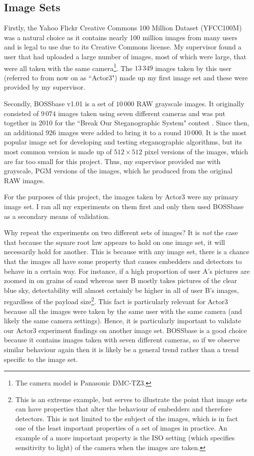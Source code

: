 \documentclass[11pt,a4paper,twoside,openright]{report}
\begin{document}
\subsection{Image Sets}

Firstly, the Yahoo Flickr Creative Commons 100 Million Dataset (YFCC100M) \cite{yfcc100m} was a natural choice as it contains nearly 100 million images from many users and is legal to use due to its Creative Commons license. My supervisor found a user that had uploaded a large number of images, most of which were large, that were all taken with the same camera\footnote{The camera model is Panasonic DMC-TZ3.}. The $13\,349$ images taken by this user (referred to from now on as ``Actor3") made up my first image set and these were provided by my supervisor.

Secondly, BOSSbase v1.01 \cite{binghamton-downloads} is a set of $10\,000$ RAW grayscale images. It originally consisted of $9\,074$ images taken using seven different cameras and was put together in 2010 for the ``Break Our Steganographic System" contest \cite{bossbase}. Since then, an additional 926 images were added to bring it to a round $10\,000$. It is the most popular image set for developing and testing steganographic algorithms, but its most common version is made up of $512\times512$ pixel versions of the images, which are far too small for this project. Thus, my supervisor provided me with grayscale, PGM versions of the images, which he produced from the original RAW images.

For the purposes of this project, the images taken by Actor3 were my primary image set. I ran all my experiments on them first and only then used BOSSbase as a secondary means of validation.

Why repeat the experiments on two different sets of images? It is \textit{not} the case that because the square root law appears to hold on one image set, it will necessarily hold for another. This is because with any image set, there is a chance that the images all have some property that causes embedders and detectors to behave in a certain way. For instance, if a high proportion of user A's pictures are zoomed in on grains of sand whereas user B mostly takes pictures of the clear blue sky, detectability will almost certainly be higher in all of user B's images, regardless of the payload size\footnote{This is an extreme example, but serves to illustrate the point that image sets can have properties that alter the behaviour of embedders and therefore detectors. This is not limited to the subject of the images, which is in fact one of the least important properties of a set of images in practice. An example of a more important property is the ISO setting (which specifies sensitivity to light) of the camera when the images are taken.}. This fact is particularly relevant for Actor3 because all the images were taken by the same user with the same camera (and likely the same camera settings). Hence, it is particularly important to validate our Actor3 experiment findings on another image set. BOSSbase is a good choice because it contains images taken with seven different cameras, so if we observe similar behaviour again then it is likely be a general trend rather than a trend specific to the image set.
\end{document}
